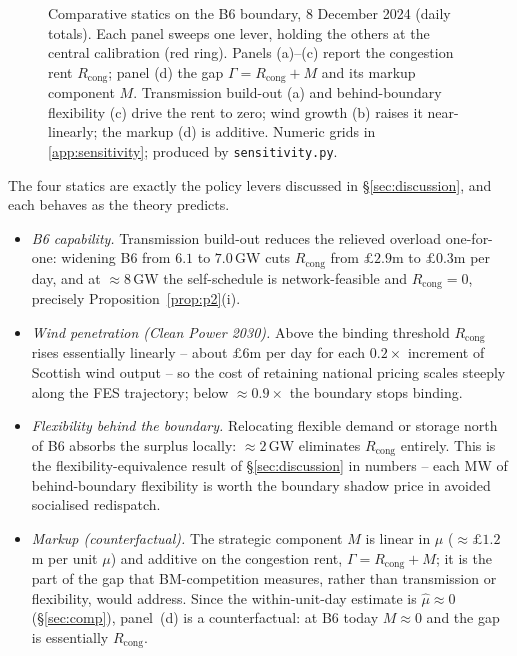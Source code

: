 \documentclass[review,3p,times]{elsarticle}
\theoremstyle{plain}
\theoremstyle{definition}
\begin{document}
\begin{figure}[t]
\caption{Comparative statics on the B6 boundary, 8 December 2024 (daily totals).
Each panel sweeps one lever, holding the others at the central calibration (red
ring). Panels (a)--(c) report the congestion rent $R_{\mathrm{cong}}$; panel (d)
the gap $\Gamma=R_{\mathrm{cong}}+M$ and its markup component $M$. Transmission
build-out (a) and behind-boundary flexibility (c) drive the rent to zero;
wind growth (b) raises it near-linearly; the markup (d) is additive. Numeric
grids in \ref{app:sensitivity}; produced by \texttt{sensitivity.py}.}
\label{fig:sens}
\end{figure}

The four statics are exactly the policy levers discussed in \S\ref{sec:discussion}, and each
behaves as the theory predicts.
\begin{itemize}
\item[--] \emph{B6 capability.} Transmission build-out reduces the relieved
overload one-for-one: widening B6 from $6.1$ to $7.0$\,GW cuts $R_{\mathrm{cong}}$
from $\pounds2.9$m to $\pounds0.3$m per day, and at $\approx8$\,GW the
self-schedule is network-feasible and $R_{\mathrm{cong}}=0$, precisely
Proposition~\ref{prop:p2}(i).
\item[--] \emph{Wind penetration (Clean Power 2030).} Above the binding threshold
$R_{\mathrm{cong}}$ rises essentially linearly -- about $\pounds6$m per day for each
$0.2\times$ increment of Scottish wind output -- so the cost of retaining national
pricing scales steeply along the FES trajectory; below $\approx0.9\times$ the
boundary stops binding.
\item[--] \emph{Flexibility behind the boundary.} Relocating flexible demand or
storage north of B6 absorbs the surplus locally: $\approx2$\,GW eliminates
$R_{\mathrm{cong}}$ entirely. This is the flexibility-equivalence result of
\S\ref{sec:discussion} in numbers -- each MW of behind-boundary flexibility is
worth the boundary shadow price in avoided socialised redispatch.
\item[--] \emph{Markup (counterfactual).} The strategic component $M$ is linear in
$\mu$ ($\approx\pounds1.2$m per unit $\mu$) and additive on the congestion rent,
$\Gamma=R_{\mathrm{cong}}+M$; it is the part of the gap that BM-competition
measures, rather than transmission or flexibility, would address. Since the
within-unit-day estimate is $\hat\mu\approx0$ (\S\ref{sec:comp}), panel~(d) is a
counterfactual: at B6 today $M\approx0$ and the gap is essentially
$R_{\mathrm{cong}}$.
\end{itemize}
\end{document}
